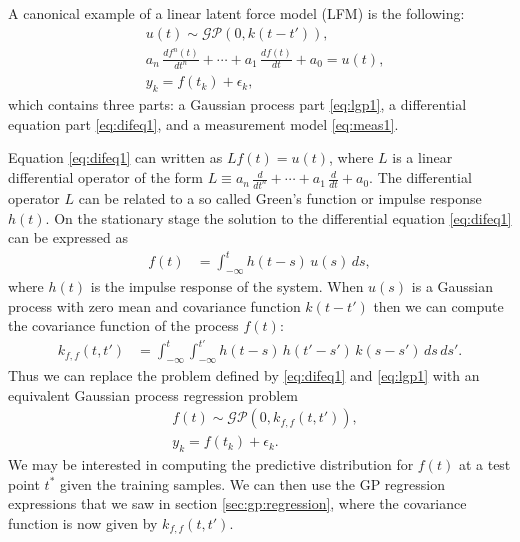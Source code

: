 \documentclass[journal]{IEEEtran}
\newcommand{\simo}[1]{{\color{red}#1}}
\begin{document}
A canonical example of a linear latent force model (LFM) \cite{Alvarez+Lawrence:2009,Alvarez+Luengo+Lawrence:2013} is the following:
%
\begin{eqnarray}
  &u(t) \sim \mathcal{GP}(0,k(t - t')), \label{eq:lgp1} \\
  &a_n \, \frac{df^{n}(t)}{dt^{n}} + \cdots
  + a_1 \, \frac{df(t)}{dt} + a_0 = u(t), \label{eq:difeq1} \\
  &y_k = f(t_k) + \epsilon_k, \label{eq:meas1}
\end{eqnarray}
%
which contains three parts: a Gaussian process part \eqref{eq:lgp1}, a differential equation part \eqref{eq:difeq1}, and a measurement model \eqref{eq:meas1}. 

Equation \eqref{eq:difeq1} can written as $L{f(t)}=u(t)$, where $L$ is a linear
differential operator of the form $L\equiv a_n \, \frac{d}{dt^{n}} + \cdots
  + a_1 \, \frac{d}{dt} + a_0$. The differential operator $L$ can be related to a so called Green's function or
impulse response $h(t)$.
On the stationary stage the solution to the differential equation \eqref{eq:difeq1} can be expressed as
%
\begin{equation}
\begin{split}
  f(t) &= \int_{-\infty}^{t} h(t - s) \, u(s) \, ds,
\end{split}
\end{equation}
%
where $h(t)$ is the impulse response of the system. When $u(s)$ is a Gaussian process with zero mean and covariance function $k(t - t')$ then we can compute the covariance function of the process $f(t)$:
%
\begin{equation}
\begin{split}
  k_{f,f}(t, t') &=
  \int_{-\infty}^{t} \int_{-\infty}^{t'}
  h(t - s) \, h(t' - s') \, k(s - s') \, ds \, ds'.
\end{split}
\label{eq:fcov}
\end{equation}
%
Thus we can replace the problem defined by \eqref{eq:difeq1} and \eqref{eq:lgp1} with an equivalent Gaussian process regression problem
%
\begin{eqnarray}
  &f(t) \sim \mathcal{GP}(0,k_{f, f}(t, t')), \label{eq:lgp2} \\
  &y_k = f(t_k) + \epsilon_k. \label{eq:meas2}
\end{eqnarray}
%
We may be interested in computing the predictive distribution for $f(t)$ at a test point $t^*$ given the training samples.
We can then use the GP regression expressions that we saw in section \ref{sec:gp:regression}, where the covariance
function is now given by $k_{f,f}(t,t')$.
\end{document}
